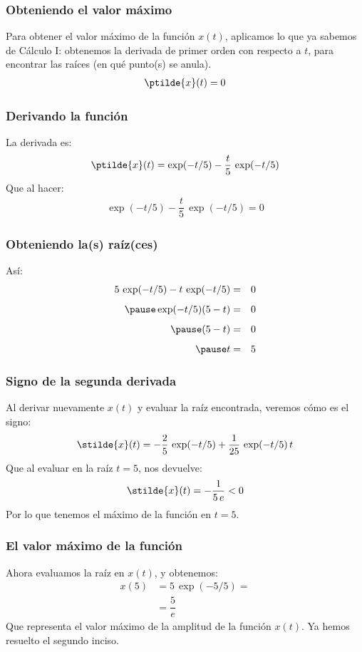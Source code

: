 \begin{frame}
\frametitle{Obteniendo el valor máximo}
Para obtener el valor máximo de la función $x(t)$, aplicamos lo que ya sabemos de Cálculo I: \pause obtenemos la derivada de primer orden con respecto a $t$, para encontrar las raíces (en qué punto(s) se anula).
\begin{align*}
\ptilde{x}(t) = 0
\end{align*}
\end{frame}
\begin{frame}
\frametitle{Derivando la función}
La derivada es:
\begin{align*}
\ptilde{x}(t) = \exp(-t/5) - \dfrac{t}{5} \, \exp(-t/5) 
\end{align*}
\pause
Que al hacer:
\begin{align*}
\exp(-t/5) - \dfrac{t}{5} \, \exp(-t/5) = 0
\end{align*}
\end{frame}
\begin{frame}
\frametitle{Obteniendo la(s) raíz(ces)}
Así:
\begin{eqnarray*}
5 \, \exp(-t/5) - t \, \exp(-t/5) &=& 0  \\[0.5em] \pause
\exp(-t/5) (5 - t) &=& 0 \\[0.5em] \pause
(5 - t) &=& 0 \\[0.5em] \pause
t &=& 5
\end{eqnarray*}
\end{frame}
\begin{frame}
\frametitle{Signo de la segunda derivada}
Al derivar nuevamente $x(t)$ y evaluar la raíz encontrada, veremos cómo es el signo:
\begin{align*}
\stilde{x}(t) = -\dfrac{2}{5} \, \exp(-t/5) + \dfrac{1}{25} \, \exp(-t/5) \, t
\end{align*}
\pause
Que al evaluar en la raíz $t = 5$, nos devuelve: \pause
\begin{align*}
\stilde{x}(t) = - \dfrac{1}{5 \, e} < 0
\end{align*}
\pause
Por lo que tenemos el máximo de la función en $t = 5$.
\end{frame}
\begin{frame}
\frametitle{El valor máximo de la función}
Ahora evaluamos la raíz en $x(t)$, y obtenemos:
\begin{align*}
x(5) &= 5 \, \exp (-5/5) = \\[0.5em]
&= \dfrac{5}{e}
\end{align*}
Que representa el valor máximo de la amplitud de la función $x(t)$. \pause Ya hemos resuelto el segundo inciso.
\end{frame}
